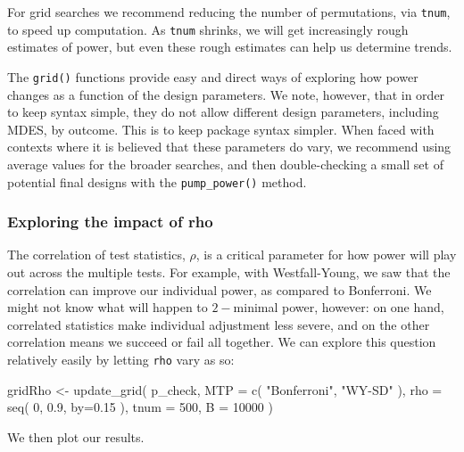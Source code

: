 \documentclass[
]{article}
\newenvironment{Shaded}{\begin{snugshade}}{\end{snugshade}}
\newcommand{\AttributeTok}[1]{\textcolor[rgb]{0.77,0.63,0.00}{#1}}
\newcommand{\DecValTok}[1]{\textcolor[rgb]{0.00,0.00,0.81}{#1}}
\newcommand{\FloatTok}[1]{\textcolor[rgb]{0.00,0.00,0.81}{#1}}
\newcommand{\FunctionTok}[1]{\textcolor[rgb]{0.00,0.00,0.00}{#1}}
\newcommand{\NormalTok}[1]{#1}
\newcommand{\OtherTok}[1]{\textcolor[rgb]{0.56,0.35,0.01}{#1}}
\newcommand{\StringTok}[1]{\textcolor[rgb]{0.31,0.60,0.02}{#1}}
\begin{document}
For grid searches we recommend reducing the number of permutations, via
\texttt{tnum}, to speed up computation. As \texttt{tnum} shrinks, we
will get increasingly rough estimates of power, but even these rough
estimates can help us determine trends.

The \texttt{grid()} functions provide easy and direct ways of exploring
how power changes as a function of the design parameters. We note,
however, that in order to keep syntax simple, they do not allow
different design parameters, including MDES, by outcome. This is to keep
package syntax simpler. When faced with contexts where it is believed
that these parameters do vary, we recommend using average values for the
broader searches, and then double-checking a small set of potential
final designs with the \texttt{pump\_power()} method.

\subsubsection{Exploring the impact of rho}

The correlation of test statistics, \(\rho\), is a critical parameter
for how power will play out across the multiple tests. For example, with
Westfall-Young, we saw that the correlation can improve our individual
power, as compared to Bonferroni. We might not know what will happen to
\(2-\)minimal power, however: on one hand, correlated statistics make
individual adjustment less severe, and on the other correlation means we
succeed or fail all together. We can explore this question relatively
easily by letting \texttt{rho} vary as so:

\begin{Shaded}
\begin{Highlighting}[]
\NormalTok{gridRho }\OtherTok{\textless{}{-}} \FunctionTok{update\_grid}\NormalTok{( p\_check,}
            \AttributeTok{MTP =} \FunctionTok{c}\NormalTok{( }\StringTok{"Bonferroni"}\NormalTok{, }\StringTok{"WY{-}SD"}\NormalTok{ ),}
            \AttributeTok{rho =} \FunctionTok{seq}\NormalTok{( }\DecValTok{0}\NormalTok{, }\FloatTok{0.9}\NormalTok{, }\AttributeTok{by=}\FloatTok{0.15}\NormalTok{ ),}
            \AttributeTok{tnum =} \DecValTok{500}\NormalTok{,}
            \AttributeTok{B =} \DecValTok{10000}\NormalTok{ )}
\end{Highlighting}
\end{Shaded}

We then plot our results.
\end{document}
